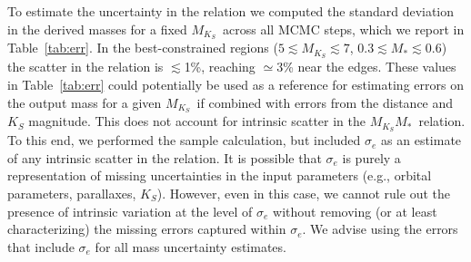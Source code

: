 \documentclass[twocolumn]{aastex62}
\newcommand{\mks}{$M_{K_S}$}
\newcommand{\mmk}{$M_{K_S}$\textendash$M_*$}
\begin{document}
To estimate the uncertainty in the relation we computed the standard deviation in the derived masses for a fixed \mks\ across all MCMC steps, which we report in Table~\ref{tab:err}. In the best-constrained regions ($5\lesssim$\mks$\lesssim7$, $0.3\lesssim M_*\lesssim0.6$) the scatter in the relation is $\lesssim$1\%, reaching $\simeq$3\% near the edges. These values in Table~\ref{tab:err} could potentially be used as a reference for estimating errors on the output mass for a given \mks\ if combined with errors from the distance and $K_S$ magnitude. This does not account for intrinsic scatter in the \mmk\ relation. To this end, we performed the sample calculation, but included $\sigma_e$ as an estimate of any intrinsic scatter in the relation. It is possible that $\sigma_e$ is purely a representation of missing uncertainties in the input parameters (e.g., orbital parameters, parallaxes, $K_S$). However, even in this case, we cannot rule out the presence of intrinsic variation at the level of $\sigma_e$ without removing (or at least characterizing) the missing errors captured within $\sigma_e$. We advise using the errors that include $\sigma_e$ for all mass uncertainty estimates.
\end{document}
